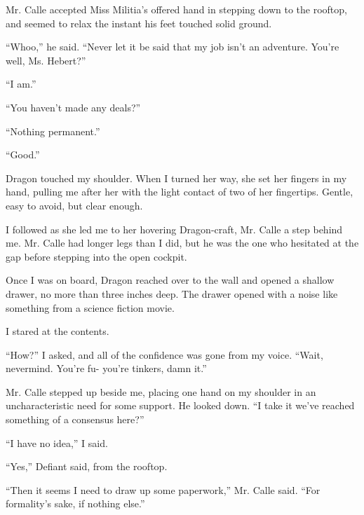 Mr. Calle accepted Miss Militia's offered hand in stepping down to the rooftop, and seemed to relax the instant his feet touched solid ground.



``Whoo,'' he said.  ``Never let it be said that my job isn't an adventure.  You're well, Ms. Hebert?''



``I am.''



``You haven't made any deals?''



``Nothing permanent.''



``Good.''



Dragon touched my shoulder.  When I turned her way, she set her fingers in my hand, pulling me after her with the light contact of two of her fingertips.  Gentle, easy to avoid, but clear enough.



I followed as she led me to her hovering Dragon-craft, Mr. Calle a step behind me.  Mr. Calle had longer legs than I did, but he was the one who hesitated at the gap before stepping into the open cockpit.



Once I was on board, Dragon reached over to the wall and opened a shallow drawer, no more than three inches deep.  The drawer opened with a noise like something from a science fiction movie.



I stared at the contents.



``How?'' I asked, and all of the confidence was gone from my voice.  ``Wait, nevermind. You're fu- you're tinkers, damn it.''



Mr. Calle stepped up beside me, placing one hand on my shoulder in an uncharacteristic need for some support.  He looked down.  ``I take it we've reached something of a consensus here?''



``I have no idea,'' I said.



``Yes,'' Defiant said, from the rooftop.



``Then it seems I need to draw up some paperwork,'' Mr. Calle said.  ``For formality's sake, if nothing else.''



